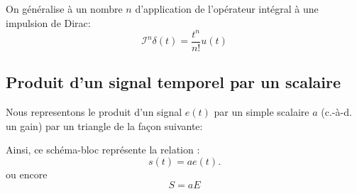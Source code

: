 On généralise à un nombre $n$ d'application de l'opérateur intégral à une
impulsion de Dirac:
\[
    \mathcal{I}^n\delta(t)=\dfrac{t^n}{n!}u(t)
\]
\subsection{Produit d'un signal temporel par un scalaire}
Nous representons le produit d'un signal $e(t)$ par un simple scalaire $a$
(c.-à-d. un gain) par un triangle de la façon suivante:
\begin{center}
    
\end{center}
Ainsi, ce schéma-bloc représente la relation : 
\[
    s(t)=ae(t).
\]
ou encore
\[
    S=aE
\]
